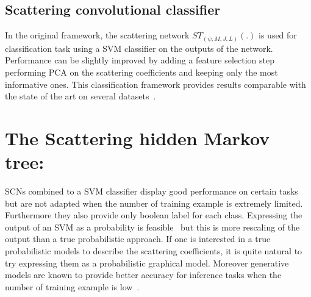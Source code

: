 \documentclass{article}
\begin{document}
  \subsection{Scattering convolutional classifier}
    \label{subsec:SCN/SCC}
  
		In the original framework, the scattering network $ST_{(\psi, M,J,L)}(.)$ is used for classification task using a SVM classifier on the outputs of the network. Performance can be slightly improved by adding a feature selection step performing PCA on the scattering coefficients and keeping only the most informative ones. This classification framework provides results comparable with the state of the art on several datasets~\citep{bruna}.
    
    



\section{The Scattering hidden Markov tree:}
\label{sec:SCHMT}

  SCNs combined to a SVM classifier display good performance on certain tasks but are not adapted when the number of training example is extremely limited. Furthermore they also provide only boolean label for each class. Expressing the output of an SVM as a probability is feasible~\citep{platt1999probabilistic} but this is more rescaling of the output than a true probabilistic approach. If one is interested in a true probabilistic models to describe the scattering coefficients, it is quite natural to try expressing them as a probabilistic graphical model. Moreover generative models are known to provide better accuracy for inference tasks when the number of training example is low~\citep{jordan2002discriminative}. \\
  
\end{document}
